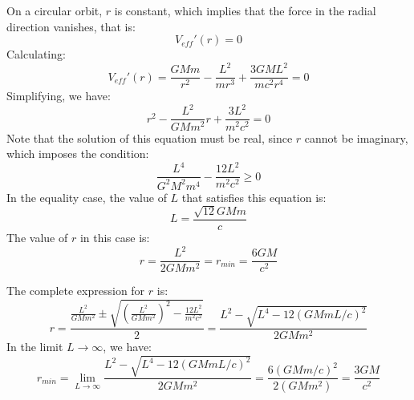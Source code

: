 \documentclass[11pt]{article}
\begin{document}
\begin{pproblem}
\begin{pssolution*}{}{}
\begin{alternativas}
            \item On a circular orbit, \(r\) is constant, which implies that the force in the radial direction vanishes, that is:
            \[V_{eff}'(r) = 0\]
            Calculating:
            \[V_{eff}'(r) = \frac{GMm}{r^2}-\frac{L^2}{mr^3}+\frac{3GML^2}{mc^2r^4}=0\]
            Simplifying, we have:
            \[r^2-\frac{L^2}{GMm^2}r+\frac{3L^2}{m^2c^2}=0\]
            Note that the solution of this equation must be real, since \(r\) cannot be imaginary, which imposes the condition:
            \[\frac{L^4}{G^2M^2m^4} - \frac{12L^2}{m^2c^2} \geq 0\]
            In the equality case, the value of \(L\) that satisfies this equation is:
            \[\boxed{L = \frac{\sqrt{12}GMm}{c}}\]
            The value of \(r\) in this case is:
            \[r = \frac{L^2}{2GMm^2} = \boxed{r_{min} = \frac{6GM}{c^2}}\] 
            
            \item The complete expression for \(r\) is:
            \[r = \frac{\frac{L^2}{GMm^2}\pm\sqrt{\left(\frac{L^2}{GMm^2}\right)^2-\frac{12L^2}{m^2c^2}}}{2} = \frac{L^2-\sqrt{L^4-12(GMmL/c)^2}}{2GMm^2}\] 
            In the limit \(L\rightarrow \infty\), we have:
            \[r_{min} = \lim_{L \rightarrow \infty}\frac{L^2-\sqrt{L^4-12(GMmL/c)^2}}{2GMm^2} = \frac{6(GMm/c)^2}{2(GMm^2)} = \boxed{\frac{3GM}{c^2}} \] 
        \end{alternativas}
    \end{pssolution*}
\end{pproblem}
\end{document}
